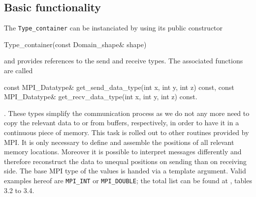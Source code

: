 \subsection{Basic functionality}
The \verb|Type_container| can be instanciated by using its public constructor
\begin{codelisting1}
	Type_container(const Domain_shape& shape)
\end{codelisting1}	
and provides references to the send and receive types. The associated functions are called
\begin{codelisting1}
 	const MPI_Datatype& get_send_data_type(int x, int y, int z) const,
 	const MPI_Datatype& get_recv_data_type(int x, int y, int z) const.
\end{codelisting1}. 	
These types simplify the communication process as we do not any more need to copy the relevant data to or from buffers, respectively, in order to have it in a continuous piece of memory. This task is rolled out to other routines provided by MPI. It is only necessary to define and assemble the positions of all relevant memory locations. Moreover it is possible to interpret messages differently and therefore reconstruct the data to unequal positions on sending than on receiving side. The base MPI type of the values is handed via a template argument. Valid examples hereof are \verb|MPI_INT| or \verb|MPI_DOUBLE|; the total list can be found at \cite{MPI_docu}, tables 3.2 to 3.4. 


